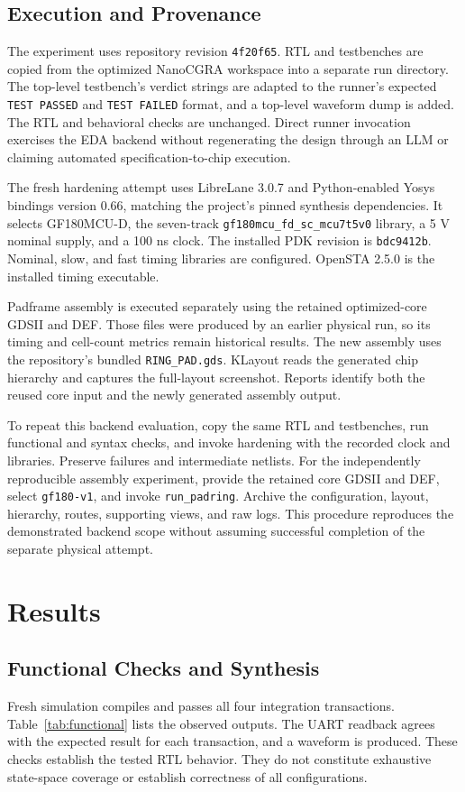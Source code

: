 \documentclass[conference,letterpaper]{IEEEtran}
\begin{document}
\subsection{Execution and Provenance}
The experiment uses repository revision \texttt{4f20f65}. RTL and testbenches are copied from the optimized NanoCGRA workspace into a separate run directory. The top-level testbench's verdict strings are adapted to the runner's expected \texttt{TEST PASSED} and \texttt{TEST FAILED} format, and a top-level waveform dump is added. The RTL and behavioral checks are unchanged. Direct runner invocation exercises the EDA backend without regenerating the design through an LLM or claiming automated specification-to-chip execution.

The fresh hardening attempt uses LibreLane 3.0.7 and Python-enabled Yosys bindings version 0.66, matching the project's pinned synthesis dependencies. It selects GF180MCU-D, the seven-track \texttt{gf180mcu\_fd\_sc\_mcu7t5v0} library, a 5 V nominal supply, and a 100 ns clock. The installed PDK revision is \texttt{bdc9412b}. Nominal, slow, and fast timing libraries are configured. OpenSTA 2.5.0 is the installed timing executable.

Padframe assembly is executed separately using the retained optimized-core GDSII and DEF. Those files were produced by an earlier physical run, so its timing and cell-count metrics remain historical results. The new assembly uses the repository's bundled \texttt{RING\_PAD.gds}. KLayout reads the generated chip hierarchy and captures the full-layout screenshot. Reports identify both the reused core input and the newly generated assembly output.

To repeat this backend evaluation, copy the same RTL and testbenches, run functional and syntax checks, and invoke hardening with the recorded clock and libraries. Preserve failures and intermediate netlists. For the independently reproducible assembly experiment, provide the retained core GDSII and DEF, select \texttt{gf180-v1}, and invoke \texttt{run\_padring}. Archive the configuration, layout, hierarchy, routes, supporting views, and raw logs. This procedure reproduces the demonstrated backend scope without assuming successful completion of the separate physical attempt.

\section{Results}
\subsection{Functional Checks and Synthesis}
Fresh simulation compiles and passes all four integration transactions. Table~\ref{tab:functional} lists the observed outputs. The UART readback agrees with the expected result for each transaction, and a waveform is produced. These checks establish the tested RTL behavior. They do not constitute exhaustive state-space coverage or establish correctness of all configurations.
\end{document}

